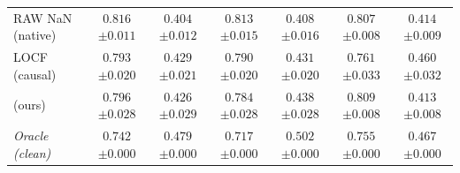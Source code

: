 \begin{table}[tbp]
\begin{tabular}{@{}l c c c c c c@{}}
RAW NaN (native) & $\mathbf{0.816}${\scriptsize$\pm0.011$} & $0.404${\scriptsize$\pm0.012$} & $\mathbf{0.813}${\scriptsize$\pm0.015$} & $0.408${\scriptsize$\pm0.016$} & $0.807${\scriptsize$\pm0.008$} & $0.414${\scriptsize$\pm0.009$} \\
LOCF (causal) & $0.793${\scriptsize$\pm0.020$} & $0.429${\scriptsize$\pm0.021$} & $0.790${\scriptsize$\pm0.020$} & $0.431${\scriptsize$\pm0.020$} & $0.761${\scriptsize$\pm0.033$} & $0.460${\scriptsize$\pm0.032$} \\
\cafe{} (ours) & $0.796${\scriptsize$\pm0.028$} & $0.426${\scriptsize$\pm0.029$} & $0.784${\scriptsize$\pm0.028$} & $0.438${\scriptsize$\pm0.028$} & $\mathbf{0.809}${\scriptsize$\pm0.008$} & $0.413${\scriptsize$\pm0.008$} \\
\emph{Oracle (clean)} & $0.742${\scriptsize$\pm0.000$} & $0.479${\scriptsize$\pm0.000$} & $0.717${\scriptsize$\pm0.000$} & $0.502${\scriptsize$\pm0.000$} & $0.755${\scriptsize$\pm0.000$} & $0.467${\scriptsize$\pm0.000$} \\
\bottomrule
\end{tabular}
\end{table}
